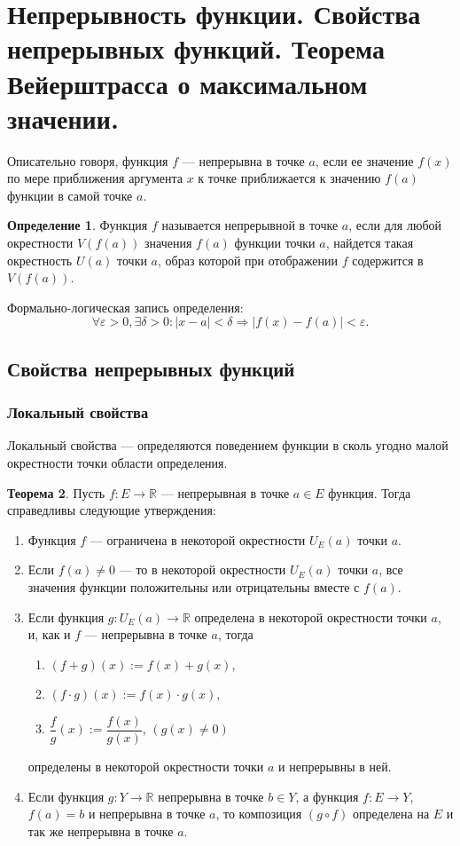 \documentclass[12pt]{report}
\theoremstyle{definition}
\newtheorem{theorem}{Теорема}[chapter]
\newtheorem{definition}[theorem]{Определение}
\newcommand{\R}{\mathbb R}
\begin{document}
\section{Непрерывность функции. Свойства непрерывных функций. Теорема Вейерштрасса о максимальном значении.}

Описательно говоря, функция $f$ --- непрерывна в точке $a$, если ее значение $f(x)$ по мере приближения
аргумента $x$ к точке приближается к значению $f(a)$ функции в самой точке $a$.

\begin{definition}
Функция $f$ называется непрерывной в точке $a$, если для любой
окрестности $V(f(a))$ значения $f(a)$ функции точки $a$, найдется такая
окрестность $U(a)$ точки $a$, образ которой при отображении $f$ содержится
в $V(f(a))$.
\end{definition}

Формально-логическая запись определения:
$$
\forall \varepsilon > 0, \exists \delta > 0:
|x - a| < \delta \Rightarrow |f(x) - f(a)| < \varepsilon.
$$


\subsection{Свойства непрерывных функций}
\subsubsection{Локальный свойства}
Локальный свойства --- определяются поведением функции в сколь угодно
малой окрестности точки области определения.

\begin{theorem}
Пусть $f: E \rightarrow \R$ --- непрерывная в точке $a \in E$ функция.
Тогда справедливы следующие утверждения:
\begin{enumerate}
  \item Функция $f$ --- ограничена в некоторой окрестности $U_E(a)$ точки $a$.
  \item Если $f(a) \ne 0$ --- то в некоторой окрестности $U_E(a)$ точки $a$,
    все значения функции положительны или отрицательны вместе с $f(a)$.
  \item Если функция $g: U_E(a) \rightarrow \R$ определена в некоторой окрестности
    точки $a$, и, как и $f$ --- непрерывна в точке $a$, тогда
    \begin{enumerate}
      \item $(f + g)(x) := f(x) + g(x)$,
      \item $(f \cdot g)(x) := f(x) \cdot g(x)$,
      \item $\dfrac{f}{g}(x) := \dfrac{f(x)}{g(x)}$, $(g(x) \ne 0)$
    \end{enumerate}
    определены в некоторой окрестности точки $a$ и непрерывны в ней.
  \item Если функция $g: Y \rightarrow \R$ непрерывна в точке $b \in Y$,
    а функция $f: E \rightarrow Y$, $f(a) = b$ и непрерывна в точке $a$,
    то композиция $(g \circ f)$ определена на $E$ и так же непрерывна в точке $a$.
\end{enumerate}
\end{theorem}
\end{document}
